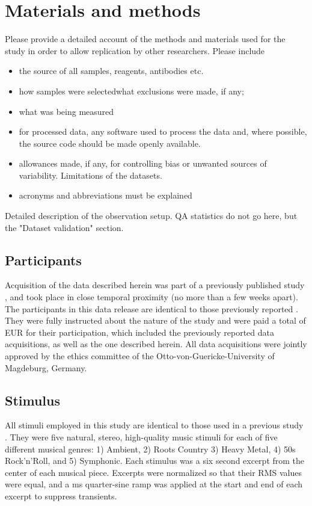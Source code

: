 \section*{Materials and methods} 
Please provide a detailed account of the methods and materials used for the study in order to allow replication by other researchers.
Please include \begin{itemize}
\item 
the source of all samples, reagents, antibodies etc.
\item 
 how samples were selectedwhat exclusions were made, if any;
\item 
what was being measured
\item 
for processed data, any software used to process the data and, where possible, the source code should be made openly available.\item 

allowances made, if any, for controlling bias or unwanted sources of variability.
Limitations of the datasets.\item 

acronyms and abbreviations must be explained
\end{itemize}

Detailed description of the observation setup. QA statistics do not go here, but the "Dataset validation" section.

\subsection*{Participants}

Acquisition of the data described herein was part of a previously published
study \cite{Hanke_2014}, and took place in close temporal proximity (no more
than a few weeks apart). The participants in this data release are identical to
those previously reported \cite{Hanke_2014}.  They were fully instructed about
the nature of the study and were paid a total of \unit[100]{EUR} for their
participation, which included the previously reported data acquisitions, as
well as the one described herein. All data acquisitions were jointly approved
by the ethics committee of the Otto-von-Guericke-University of Magdeburg,
Germany.


\subsection*{Stimulus}

All stimuli employed in this study are identical to those used in a previous
study \cite[for details refer to][]{Casey_2012}. They were five natural,
stereo, high-quality music stimuli for each of five different musical genres:
1) Ambient, 2) Roots Country 3) Heavy Metal, 4) 50s Rock'n'Roll, and 5)
Symphonic.  Each stimulus was a six second excerpt from the center of each
musical piece.  Excerpts were normalized so that their RMS values were equal,
and a \unit[50]{ms} quarter-sine ramp was applied at the start and end of each excerpt
to suppress transients.

